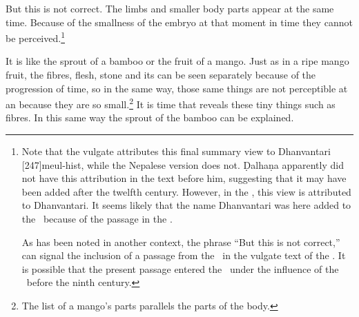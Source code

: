 \begin{translation}
    But this is not correct.  The limbs and smaller body parts appear
at the same time.  Because of the smallness of the embryo at that
moment in time they cannot be perceived.\footnote{Note that the
    vulgate attributes this final summary view to Dhanvantari 
    [247]{meul-hist}, while the Nepalese
    version does not. Ḍalhaṇa apparently did not have this attribution
    in the text before him, suggesting that it may have been added
    after the twelfth century.  However, in the \CS, this view is attributed to 
    Dhanvantari.  It seems likely that the name Dhanvantari was here added to 
    the \SS\ because of the passage in the \CS.
    
    As has been noted in another context, the phrase  
    “But this is not correct,” can signal the inclusion of a passage from the \CS\ in 
    the vulgate text of the \SS \citep{wuja-2025}.  It is possible that the present 
    passage entered the \SS\ under the influence of the \CS\ before the ninth 
    century.}
        
        It is like the sprout of a bamboo or the fruit of a mango.
Just as in a ripe mango fruit, the fibres, flesh, stone and
its  can be seen separately because of the
progression of time, so in the same way, those same things are
not perceptible at an  because they
are so small.\footnote{The list of a mango's parts parallels
    the parts of the body.} It is time that reveals these tiny
    things such as fibres. In this same way the sprout of the
    bamboo can be explained.
    

\end{translation}
